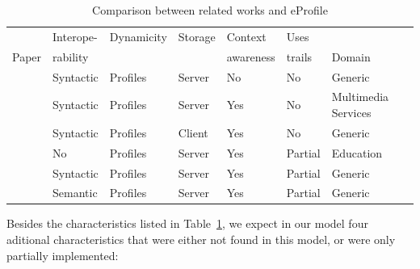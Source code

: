 \documentclass[preprint,authoryear,12pt,dvipdfm]{elsarticle}
\begin{document}
\begin{table}\centering\footnotesize
  \begin{tabular*}{1.16\textwidth}{@{}lllllll@{}}
    \toprule
                                         & Interope-  & Dynamicity   & Storage  & Context       & Uses    &                     \\
    Paper                                & rability   &             &          & awareness     & trails  & Domain              \\
    \midrule
    \citet{kim08}                    & Syntactic   & Profiles       & Server   & No            & No      & Generic             \\
    \citet{chellouche10}             & Syntactic   & Profiles       & Server   & Yes           & No      & Multimedia Services \\
    \citet{niederee04}               & Syntactic   & Profiles       & Client   & Yes           & No      & Generic             \\
    \citet{pelep}                    & No         & Profiles       & Server   & Yes           & Partial & Education           \\
    \citet{razmerita11}              & Syntactic   & Profiles       & Server   & Yes           & Partial & Generic             \\
    \citet{tao11}                    & Semantic   & Profiles       & Server   & Yes           & Partial & Generic             \\
    \bottomrule
  \end{tabular*}
  \caption{Comparison between related works and eProfile}
  \label{tab:comparacao2}
\end{table}

Besides the characteristics listed in Table~\ref{tab:comparacao2}, we expect in our model four aditional characteristics that were either not found in this model, or were only partially implemented: 
\end{document}

